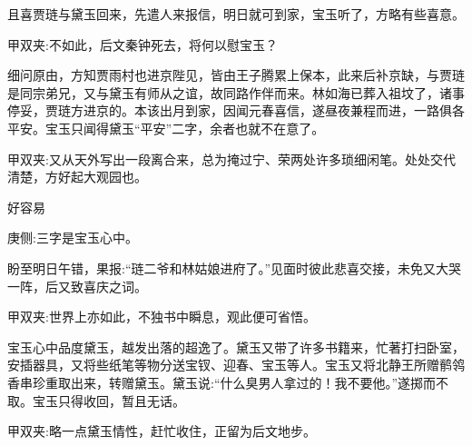 \begin{parag}
    且喜贾琏与黛玉回来，先遣人来报信，明日就可到家，宝玉听了，方略有些喜意。\begin{note}甲双夹:不如此，后文秦钟死去，将何以慰宝玉？\end{note}细问原由，方知贾雨村也进京陛见，皆由王子腾累上保本，此来后补京缺，与贾琏是同宗弟兄，又与黛玉有师从之谊，故同路作伴而来。林如海已葬入祖坟了，诸事停妥，贾琏方进京的。本该出月到家，因闻元春喜信，遂昼夜兼程而进，一路俱各平安。宝玉只闻得黛玉“平安”二字，余者也就不在意了。\begin{note}甲双夹:又从天外写出一段离合来，总为掩过宁、荣两处许多琐细闲笔。处处交代清楚，方好起大观园也。\end{note}
\end{parag}


\begin{parag}
    好容易\begin{note}庚侧:三字是宝玉心中。\end{note}盼至明日午错，果报:“琏二爷和林姑娘进府了。”见面时彼此悲喜交接，未免又大哭一阵，后又致喜庆之词。\begin{note}甲双夹:世界上亦如此，不独书中瞬息，观此便可省悟。\end{note}宝玉心中品度黛玉，越发出落的超逸了。黛玉又带了许多书籍来，忙著打扫卧室，安插器具，又将些纸笔等物分送宝钗、迎春、宝玉等人。宝玉又将北静王所赠鹡鸰香串珍重取出来，转赠黛玉。黛玉说:“什么臭男人拿过的！我不要他。”遂掷而不取。宝玉只得收回，暂且无话。\begin{note}甲双夹:略一点黛玉情性，赶忙收住，正留为后文地步。\end{note}
\end{parag}


